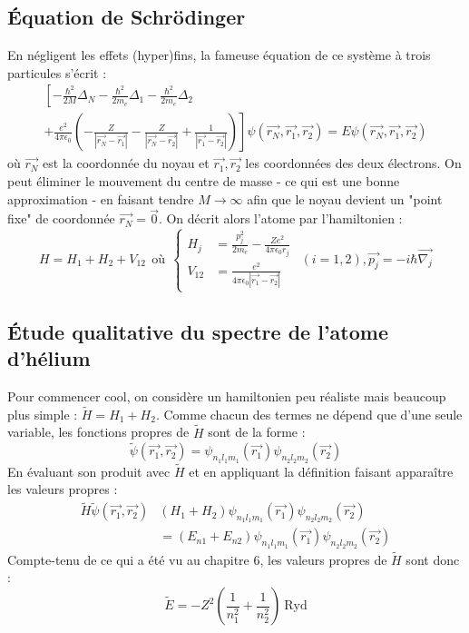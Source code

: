 \documentclass[british,french,11pt, a4paper, openany]{book}
\begin{document}
\subsection{Équation de Schrödinger}
En négligent les effets (hyper)fins, la fameuse équation de ce système à trois 
particules s'écrit :
\begin{multline}
	\left[-\frac{\hbar^2}{2M}\Delta_N-\frac{\hbar^2}{2m_e}\Delta_1-\frac{\hbar^2}{2m_e}\Delta_2\right.\\
	\left.+\frac{e^2}{4\pi\epsilon_0} \left(-\frac{Z}{|\vec{r_N}-\vec{r_1}|}-\frac{Z}{|\vec{r_N}-
		\vec{r_2}|}+\frac{1}{|\vec{r_1}-\vec{r_2}|}\right)\right]\psi(\vec{r_N},\vec{r_1},\vec{r_2}) = 
	E\psi(\vec{r_N},\vec{r_1},\vec{r_2})
\end{multline}
où $\vec{r_N}$ est la coordonnée du noyau et $\vec{r_1},\vec{r_2}$ les coordonnées 
des deux électrons. On peut éliminer le mouvement du centre de masse - ce qui est
une bonne approximation - en faisant tendre $M \rightarrow \infty$ afin que le 
noyau devient un "point fixe" de coordonnée $\vec{r_N}=\vec{0}$. On décrit alors 
l'atome par l'hamiltonien :
\begin{equation}
	H = H_1+H_2+V_12\ \ \text{où}\ \ \left\{\begin{array}{ll}
		H_j &= \frac{p_j^2}{2m_e}-\frac{Ze^2}{4\pi\epsilon_0r_j}  \\
		V_{12} &= \frac{e^2}{4\pi\epsilon_0|\vec{r_1}-\vec{r_2}|} 
	\end{array}\right.\ \ (i=1,2), \vec{p_j}=-i\hbar\vec{\nabla_j}
\end{equation}


\subsection{Étude qualitative du spectre de l'atome d'hélium}
Pour commencer cool, on considère un hamiltonien peu réaliste mais beaucoup plus
simple : $\tilde{H} = H_1+H_2$. Comme chacun des termes ne dépend que d'une 
seule variable, les fonctions propres de $\tilde{H}$ sont de la forme :
\begin{equation}
	\tilde{\psi}(\vec{r_1},\vec{r_2}) = \psi_{n_1l_1m_1}(\vec{r_1})\psi_{n_2l_2m_2}(
	\vec{r_2})
\end{equation}
En évaluant son produit avec $\tilde{H}$ et en appliquant la définition faisant
apparaître les valeurs propres : 
\begin{equation}
	\begin{array}{ll}
		\tilde{H}\tilde{\psi}(\vec{r_1},\vec{r_2}) & (H_1+H_2)\psi_{n_1l_1m_1}(\vec{r_1})                                    
		\psi_{n_2l_2m_2}(\vec{r_2})\\
		& = (E_{n1}+E_{n2})\psi_{n_1l_1m_1}(\vec{r_1})\psi_{n_2l_2m_2}(\vec{r_2}) 
	\end{array}
\end{equation}
Compte-tenu de ce qui a été vu au chapitre 6, les valeurs propres de $\tilde{H}$ sont 
donc :
\begin{equation}
	\tilde{E} = -Z^2\left(\frac{1}{n_1^2}+\frac{1}{n_2^2}\right)\ \text{Ryd}
\end{equation}
\end{document}
